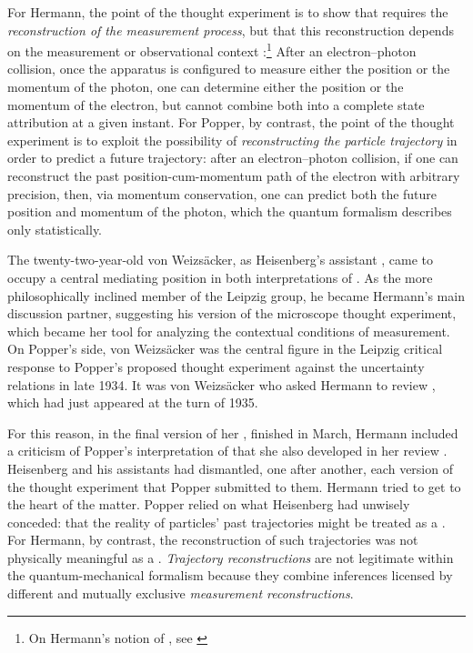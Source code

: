 \documentclass[pdflatex]{sn-jnl}
\renewcommand{\cite}{\citealp}
\newcommand{\LdF}{\bt{Logik der Forschung}\xspace}
\newcommand{\TE}{thought experiment\xspace}
\newcommand{\UR}{uncertainty relations\xspace}
\newcommand{\vW}{von Weizsäcker\xspace}
\newcommand{\OC}{observational context\xspace}
\begin{document}
For Hermann, the point of the \TE is to show that \qm requires the \emph{reconstruction of the measurement process}, but that this reconstruction depends on the measurement or observational context :\footnote{On Hermann's notion of \s{\OC}, see \cite{Crull2017a}} After an electron--photon collision, once the apparatus is configured to measure either the position or the momentum of the photon, one can determine either the position or the momentum of the electron, but cannot combine both into a complete state attribution at a given instant. For Popper, by contrast, the point of the \TE is to exploit the possibility of \emph{reconstructing the particle trajectory} in order to predict a future trajectory: after an electron--photon collision, if one can reconstruct the past position-cum-momentum path of the electron with arbitrary precision, then, via momentum conservation, one can predict both the future position and momentum of the photon, which the quantum formalism describes only statistically.

The twenty-two-year-old \vW, as Heisenberg's assistant \citep{Cassidy2015}, came to occupy a central mediating position in both interpretations of \qm. As the more philosophically inclined member of the Leipzig group, he became Hermann's main discussion partner, suggesting his version of the microscope \TE, which became her tool for analyzing the contextual conditions of measurement. On Popper's side, \vW was the central figure in the Leipzig critical response to Popper's proposed \TE against the \UR in late 1934. It was \vW who asked Hermann to review \LdF, which had just appeared at the turn of 1935.

For this reason, in the final version of her , finished in March, Hermann included a criticism of Popper's interpretation of \qm that she also developed in her review \citep{Hermann1935a}. Heisenberg and his assistants had dismantled, one after another, each version of the \TE that Popper submitted to them. Hermann tried to get to the heart of the matter. Popper relied on what Heisenberg had unwisely conceded: that the reality of particles' past trajectories might be treated as a . For Hermann, by contrast, the reconstruction of such trajectories was not physically meaningful as a . \emph{Trajectory reconstructions} are not legitimate within the quantum-mechanical formalism because they combine inferences licensed by different and mutually exclusive \emph{measurement reconstructions}.
\end{document}
